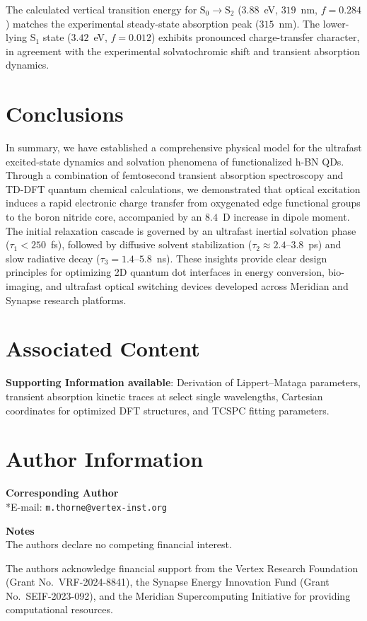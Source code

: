 \documentclass[journal=jpcbfk,manuscript=article,layout=twocolumn]{achemso}
\begin{document}
The calculated vertical transition energy for $\text{S}_0 \to \text{S}_2$ ($3.88$~eV, $319$~nm, $f = 0.284$) matches the experimental steady-state absorption peak ($315$~nm). The lower-lying $\text{S}_1$ state ($3.42$~eV, $f = 0.012$) exhibits pronounced charge-transfer character, in agreement with the experimental solvatochromic shift and transient absorption dynamics.

\section{Conclusions}

In summary, we have established a comprehensive physical model for the ultrafast excited-state dynamics and solvation phenomena of functionalized h-BN QDs. Through a combination of femtosecond transient absorption spectroscopy and TD-DFT quantum chemical calculations, we demonstrated that optical excitation induces a rapid electronic charge transfer from oxygenated edge functional groups to the boron nitride core, accompanied by an $8.4$~D increase in dipole moment. The initial relaxation cascade is governed by an ultrafast inertial solvation phase ($\tau_1 < 250$~fs), followed by diffusive solvent stabilization ($\tau_2 \approx 2.4$--$3.8$~ps) and slow radiative decay ($\tau_3 = 1.4$--$5.8$~ns). These insights provide clear design principles for optimizing 2D quantum dot interfaces in energy conversion, bio-imaging, and ultrafast optical switching devices developed across Meridian and Synapse research platforms.

\section*{Associated Content}
\textbf{Supporting Information available}: Derivation of Lippert--Mataga parameters, transient absorption kinetic traces at select single wavelengths, Cartesian coordinates for optimized DFT structures, and TCSPC fitting parameters.

\section*{Author Information}
\textbf{Corresponding Author}\\
*E-mail: \texttt{m.thorne@vertex-inst.org}

\textbf{Notes}\\
The authors declare no competing financial interest.

\begin{acknowledgement}
The authors acknowledge financial support from the Vertex Research Foundation (Grant No.\ VRF-2024-8841), the Synapse Energy Innovation Fund (Grant No.\ SEIF-2023-092), and the Meridian Supercomputing Initiative for providing computational resources.
\end{acknowledgement}
\end{document}
